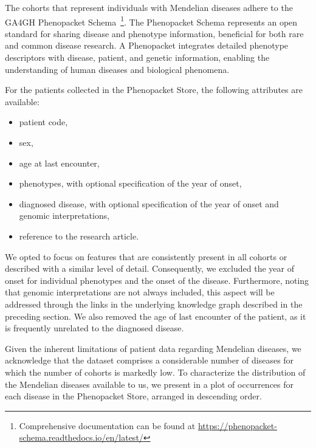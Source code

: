 The cohorts that represent individuals with Mendelian diseases adhere to the GA4GH Phenopacket Schema~\cite{jacobsen2022ga4ghPhenopacketSchema}\footnote{Comprehensive documentation can be found at \url{https://phenopacket-schema.readthedocs.io/en/latest/}}. The Phenopacket Schema represents an open standard for sharing disease and phenotype information, beneficial for both rare and common disease research. A Phenopacket integrates detailed phenotype descriptors with disease, patient, and genetic information, enabling the understanding of human diseases and biological phenomena.

For the patients collected in the Phenopacket Store, the following attributes are available:
\begin{itemize}
  \item patient code,
  \item sex,
  \item age at last encounter,
  \item phenotypes, with optional specification of the year of onset,
  \item diagnosed disease, with optional specification of the year of onset and genomic interpretations,
  \item reference to the research article.
\end{itemize}

We opted to focus on features that are consistently present in all cohorts or described with a similar level of detail. Consequently, we excluded the year of onset for individual phenotypes and the onset of the disease. Furthermore, noting that genomic interpretations are not always included, this aspect will be addressed through the links in the underlying knowledge graph described in the preceding section. We also removed the age of last encounter of the patient, as it is frequently unrelated to the diagnosed disease.

Given the inherent limitations of patient data regarding Mendelian diseases, we acknowledge that the dataset comprises a considerable number of diseases for which the number of cohorts is markedly low. To characterize the distribution of the Mendelian diseases available to us, we present in  a plot of occurrences for each disease in the Phenopacket Store, arranged in descending order.



